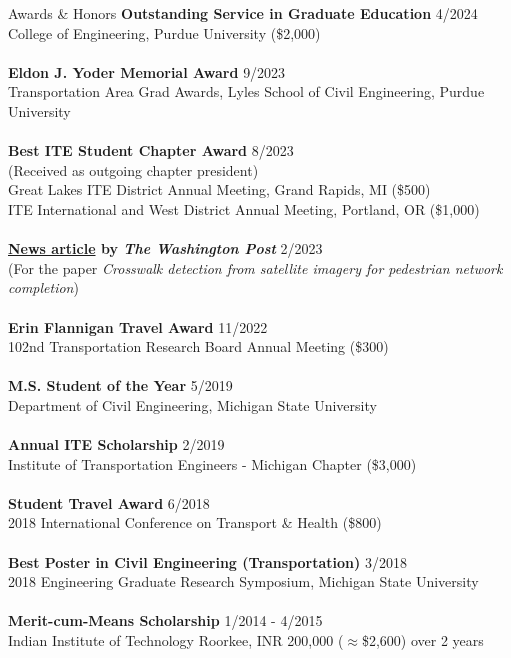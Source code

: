 \documentclass{CV} %
\begin{document}
\begin{rSection}{Awards \& Honors}%
    \textbf{Outstanding Service in Graduate Education} \hfill {4/2024}
    \\ College of Engineering, Purdue University (\$2,000) \\
    \\ \textbf{Eldon J. Yoder Memorial Award} \hfill {9/2023}
    \\ Transportation Area Grad Awards, Lyles School of Civil Engineering, Purdue University \\
    \\ \textbf{Best ITE Student Chapter Award} \hfill {8/2023}
    \\ (Received as outgoing chapter president)
    \\ Great Lakes ITE District Annual Meeting, Grand Rapids, MI (\$500)
    \\ ITE International and West District Annual Meeting, Portland, OR (\$1,000) \\
    \\ \textbf{\href{https://www.washingtonpost.com/transportation/2023/02/25/sidewalks-crosswalks-study/}{News article} by \textit{The Washington Post}} \hfill {2/2023}
    \\ (For the paper \textit{Crosswalk detection from satellite imagery for pedestrian network completion}) \\
    \\ \textbf{Erin Flannigan Travel Award} \hfill {11/2022}
    \\ 102nd Transportation Research Board Annual Meeting (\$300) \\
    \\ \textbf{M.S. Student of the Year} \hfill {5/2019}
    \\ Department of Civil Engineering, Michigan State University \\
    \\ \textbf{Annual ITE Scholarship} \hfill {2/2019}
    \\ Institute of Transportation Engineers - Michigan Chapter (\$3,000) \\
    \\ \textbf{Student Travel Award} \hfill {6/2018}
    \\ 2018 International Conference on Transport \& Health (\$800) \\
    \\ \textbf{Best Poster in Civil Engineering (Transportation)} \hfill{3/2018}
    \\ 2018 Engineering Graduate Research Symposium, Michigan State University \\
    \\ \textbf{Merit-cum-Means Scholarship} \hfill{1/2014 - 4/2015}
    \\ Indian Institute of Technology Roorkee, INR 200,000 ($\approx$\$2,600) over 2 years
\end{rSection}
\end{document}
